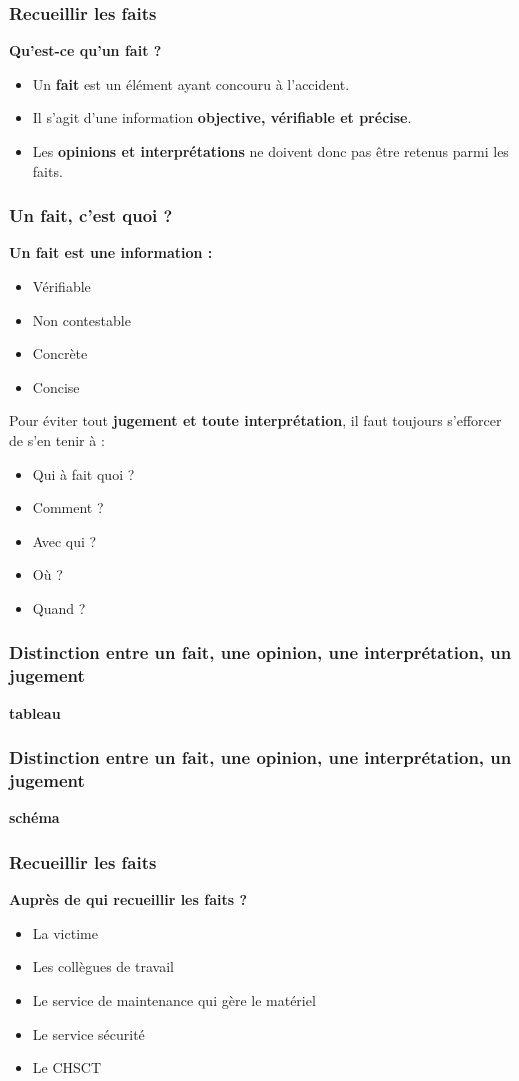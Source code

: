 \documentclass{beamer}
\begin{document}
\begin{frame}
\frametitle{Recueillir les faits}

\textbf{Qu’est-ce qu’un fait ?}
\begin{itemize}
	\item Un \textbf{fait} est un élément ayant concouru à l’accident.
\item Il s’agit d’une information \textbf{objective, vérifiable et précise}.
\item Les \textbf{opinions et interprétations} ne doivent donc pas être retenus parmi les faits.
\end{itemize}
\end{frame}

\begin{frame}
\frametitle{Un fait, c’est quoi ?}

\textbf{Un fait est une information :}
\begin{itemize}
	\item Vérifiable
\item Non contestable
\item Concrète
\item Concise
\end{itemize}
Pour éviter tout \textbf{jugement et toute interprétation}, il faut toujours s’efforcer de s’en tenir à :
\begin{itemize}
	\item Qui à fait quoi ?
\item Comment ?
\item Avec qui ?
\item Où ?
\item Quand ?
\end{itemize}
\end{frame}

\begin{frame}
\frametitle{Distinction entre un fait, une opinion, une interprétation, un jugement}

\textbf{tableau}
\end{frame}

\begin{frame}
\frametitle{Distinction entre un fait, une opinion, une interprétation, un jugement}

\textbf{schéma}
\end{frame}

\begin{frame}
\frametitle{Recueillir les faits}

\textbf{Auprès de qui recueillir les faits ?}
\begin{itemize}
	\item La victime
\item Les collègues de travail
\item Le service de maintenance qui gère le matériel
\item Le service sécurité
\item Le CHSCT
\end{itemize}
\end{frame}
\end{document}
